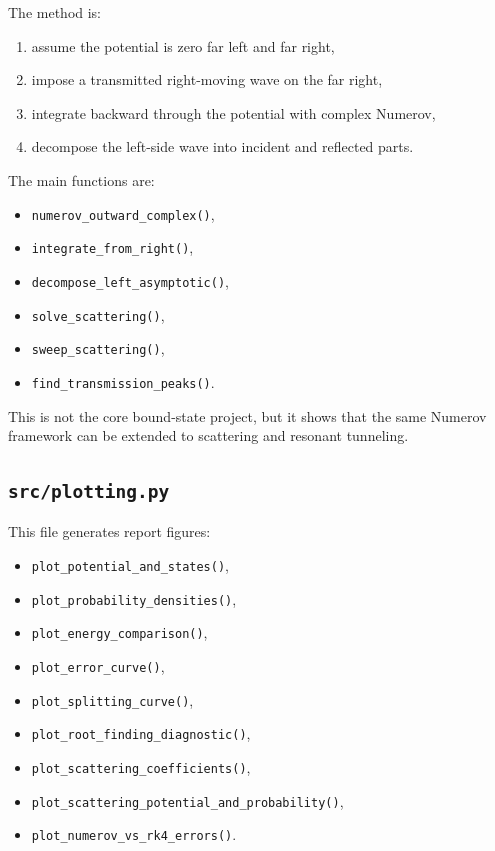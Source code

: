 \documentclass[11pt]{article}
\begin{document}
    The method is:
    \begin{enumerate}
        \item assume the potential is zero far left and far right,
        \item impose a transmitted right-moving wave on the far right,
        \item integrate backward through the potential with complex Numerov,
        \item decompose the left-side wave into incident and reflected parts.
    \end{enumerate}

    The main functions are:
    \begin{itemize}
        \item \texttt{numerov\_outward\_complex()},
        \item \texttt{integrate\_from\_right()},
        \item \texttt{decompose\_left\_asymptotic()},
        \item \texttt{solve\_scattering()},
        \item \texttt{sweep\_scattering()},
        \item \texttt{find\_transmission\_peaks()}.
    \end{itemize}

    This is not the core bound-state project, but it shows that the same Numerov framework can be extended to scattering and resonant tunneling.

    \subsection{\texttt{src/plotting.py}}

    This file generates report figures:
    \begin{itemize}
        \item \texttt{plot\_potential\_and\_states()},
        \item \texttt{plot\_probability\_densities()},
        \item \texttt{plot\_energy\_comparison()},
        \item \texttt{plot\_error\_curve()},
        \item \texttt{plot\_splitting\_curve()},
        \item \texttt{plot\_root\_finding\_diagnostic()},
        \item \texttt{plot\_scattering\_coefficients()},
        \item \texttt{plot\_scattering\_potential\_and\_probability()},
        \item \texttt{plot\_numerov\_vs\_rk4\_errors()}.
    \end{itemize}
\end{document}
